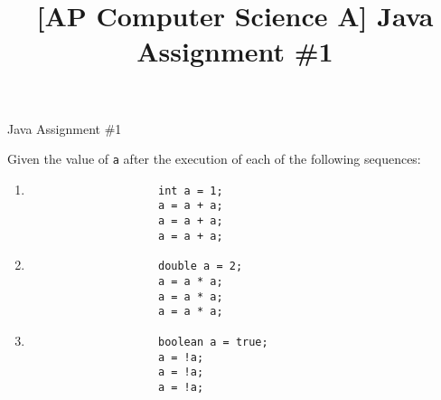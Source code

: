 \documentclass[11pt]{exam}
\title{[AP Computer Science A] Java Assignment \#1}
\newcommand{\AssignmentTitle}{Java Assignment \#1}
\newcommand{\ColorQuestion}[2]{\renewcommand{\questionlabel}{\colorbox{#1}{\color{white}\thequestion}\hfill}\question #2}
\newcommand{\BlueQuestion}[1]{\ColorQuestion{RoyalBlue}{#1}}
\begin{document}
	\begin{center}
		\Large\AssignmentTitle
	\end{center}

	\begin{questions}
		\BlueQuestion{Given the value of \texttt{a} after the execution of each of the following sequences:}
		\begin{enumerate}
			\item
				\begin{lstlisting}
					int a = 1;
					a = a + a;
					a = a + a;
					a = a + a;
				\end{lstlisting}

			\item
				\begin{lstlisting}
					double a = 2;
					a = a * a;
					a = a * a;
					a = a * a;
				\end{lstlisting}
				
			\item
				\begin{lstlisting}
					boolean a = true;
					a = !a;
					a = !a;
					a = !a;
				\end{lstlisting}
		\end{enumerate}
	\end{questions}
\end{document}
